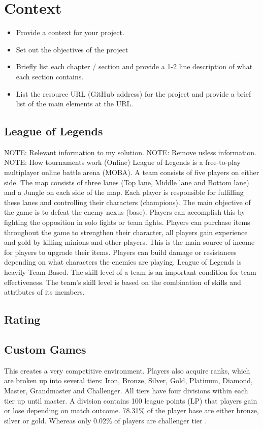 \chapter{Context}
\begin{itemize}
	\item Provide a context for your project.
	\item Set out the objectives of the project
	\item Briefly list each chapter / section and provide a 1-2 line description of what each section contains.
	\item List the resource URL (GitHub address) for the project and provide a brief list of the main elements at the URL.
\end{itemize}

\section{League of Legends}
NOTE: Relevant information to my solution.
NOTE: Remove usless information.
NOTE: How tournaments work (Online)
League of Legends is a free-to-play multiplayer online battle arena (MOBA). A team consists of five players on either side. The map consists of three lanes (Top lane, Middle lane and Bottom lane) and a Jungle on each side of the map. Each player is responsible for fulfilling these lanes and controlling their characters (champions). The main objective of the game is to defeat the enemy nexus (base). Players can accomplish this by fighting the opposition in solo fights or team fights. Players can purchase items throughout the game to strengthen their character, all players gain experience and gold by killing minions and other players. This is the main source of income for players to upgrade their items. Players can build damage or resistances depending on what characters the enemies are playing.
League of Legends is heavily Team-Based. The skill level of a team is an important condition for team effectiveness. The team's skill level is based on the combination of skills and attributes of its members.

\section{Rating}
\section{Custom Games}
This creates a very competitive environment. Players also acquire ranks, which are broken up into several tiers: Iron, Bronze, Silver, Gold, Platinum, Diamond, Master, Grandmaster and Challenger. All tiers have four divisions within each tier up until master. A division contains 100 league points (LP) that players gain or lose depending on match outcome. 78.31\% of the player base are either bronze, silver or gold. Whereas only 0.02\% of players are challenger tier \cite{kou2016ranking}.

